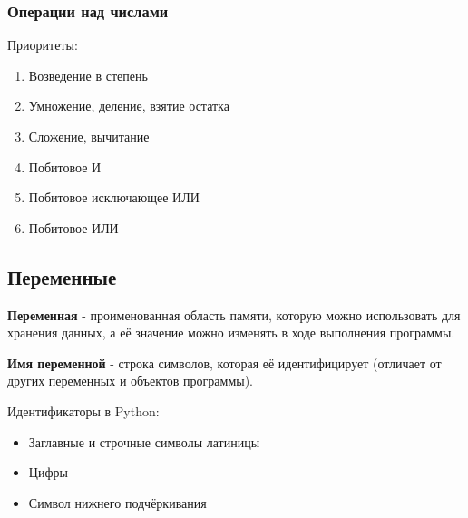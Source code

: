 \subsubsection{Операции над числами}

Приоритеты:
\begin{enumerate}
  \item Возведение в степень
  \item Умножение, деление, взятие остатка
  \item Сложение, вычитание
  \item Побитовое И
  \item Побитовое исключающее ИЛИ
  \item Побитовое ИЛИ
\end{enumerate}

\subsection{Переменные}

\begin{definition}
  \textbf{Переменная} - проименованная область памяти, которую можно использовать для хранения данных, а её значение можно изменять в ходе выполнения программы.
\end{definition}

\begin{definition}
  \textbf{Имя переменной} - строка символов, которая её идентифицирует (отличает от других переменных и объектов программы).
\end{definition}

Идентификаторы в Python:
\begin{itemize}
  \item Заглавные и строчные символы латиницы
  \item Цифры
  \item Символ нижнего подчёркивания
\end{itemize}

